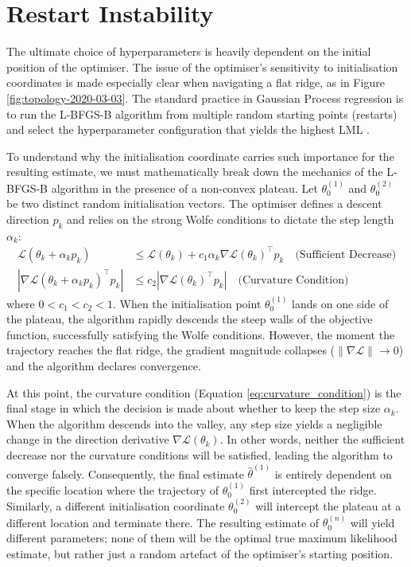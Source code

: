 \documentclass[12pt,oneside]{report}
\theoremstyle{definition}
\theoremstyle{remark}
\begin{document}
\section{Restart Instability}
\label{sec:restart_instability}
The ultimate choice of hyperparameters is heavily dependent on the initial position of the optimiser. The issue of the optimiser's sensitivity to initialisation coordinates is made especially clear when navigating a flat ridge, as in Figure \ref{fig:topology-2020-03-03}. The standard practice in Gaussian Process regression is to run the L-BFGS-B algorithm from multiple random starting points (restarts) and select the hyperparameter configuration that yields the highest LML \cite{rasmussen2006gp, pedregosa2011scikit}. 

To understand why the initialisation coordinate carries such importance for the resulting estimate, we must mathematically break down the mechanics of the L-BFGS-B algorithm in the presence of a non-convex plateau. Let $\theta_0^{(1)}$ and $\theta_0^{(2)}$ be two distinct random initialisation vectors. The optimiser defines a descent direction $p_k$ and relies on the strong Wolfe conditions to dictate the step length $\alpha_k$:
\begin{align}
    \mathcal{L}(\theta_k + \alpha_k p_k) &\leq \mathcal{L}(\theta_k) + c_1 \alpha_k \nabla \mathcal{L}(\theta_k)^\top p_k \quad \text{(Sufficient Decrease)} \\
    |\nabla \mathcal{L}(\theta_k + \alpha_k p_k)^\top p_k| &\leq c_2 |\nabla \mathcal{L}(\theta_k)^\top p_k| \quad \text{(Curvature Condition)} \label{eq:curvature_condition}
\end{align}
where $0 < c_1 < c_2 < 1$. When the initialisation point $\theta_0^{(1)}$ lands on one side of the plateau, the algorithm rapidly descends the steep walls of the objective function, successfully satisfying the Wolfe conditions. However, the moment the trajectory reaches the flat ridge, the gradient magnitude collapses ($\|\nabla \mathcal{L}\| \to 0$) and the algorithm declares convergence. 

At this point, the curvature condition (Equation \ref{eq:curvature_condition}) is the final stage in which the decision is made about whether to keep the step size $\alpha_k$. When the algorithm descends into the valley, any step size yields a negligible change in the direction derivative $\nabla \mathcal{L}(\theta_k)$. In other words, neither the sufficient decrease nor the curvature conditions will be satisfied, leading the algorithm to converge falsely. Consequently, the final estimate $\hat{\theta}^{(1)}$ is entirely dependent on the specific location where the trajectory of $\theta_0^{(1)}$ first intercepted the ridge. Similarly, a different initialisation coordinate $\theta_0^{(2)}$ will intercept the plateau at a different location and terminate there. The resulting estimate of $\theta_0^{(n)}$ will yield different parameters; none of them will be the optimal true maximum likelihood estimate, but rather just a random artefact of the optimiser's starting position.
\end{document}
